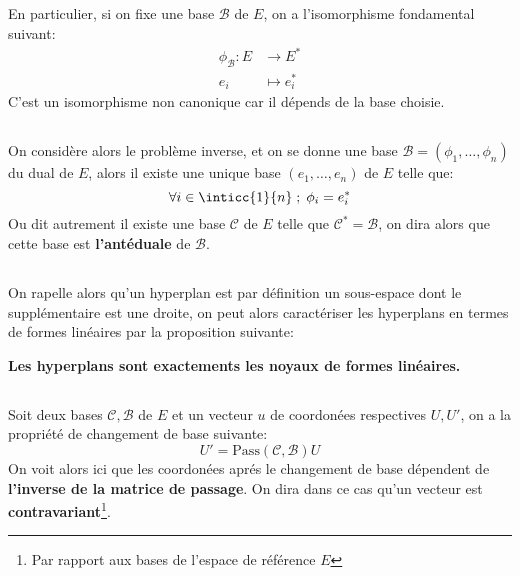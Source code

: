 \subsection*{}
En particulier, si on fixe une base \( \mathscr{B} \) de \( E \), on a l'isomorphisme fondamental suivant:
\[ 
   \begin{aligned}
      \phi_{\mathscr{B}} : E &\longrightarrow E^* \\
      e_i &\longmapsto e_i^*
   \end{aligned} 
\]
C'est un isomorphisme non canonique car il dépends de la base choisie.
\subsection*{}
On considère alors le problème inverse, et on se donne une base \(\mathscr{B} = (\phi_1, \ldots, \phi_n)\) du dual de \(E\), alors il existe une unique base \((e_1, \ldots, e_n)\) de \(E\) telle que:
\[
   \forall i \in \inticc{1}{n} \; ; \; \phi_i = e_i^*   
\] 
Ou dit autrement il existe une base \(\mathscr{C}\) de \(E\) telle que \(\mathscr{C}^* = \mathscr{B}\), on dira alors que cette base est \textbf{l'antéduale} de \( \mathscr{B} \).
\subsection*{}
On rapelle alors qu'un hyperplan est par définition un sous-espace dont le supplémentaire est une droite, on peut alors caractériser les hyperplans en termes de formes linéaires par la proposition suivante:
\begin{center}
   \textbf{Les hyperplans sont exactements les noyaux de formes linéaires.}
\end{center}
\subsection*{}
Soit deux bases \( \mathscr{C}, \mathscr{B}\) de \(E\) et un vecteur \(u\) de coordonées respectives \(U, U'\), on a la propriété de changement de base suivante:
\[
   U' = \text{Pass}(\mathscr{C}, \mathscr{B})U
\]
On voit alors ici que les coordonées aprés le changement de base dépendent de \textbf{l'inverse de la matrice de passage}. On dira dans ce cas qu'un vecteur est \textbf{contravariant}\footnote[1]{Par rapport aux bases de l'espace de référence \( E \)}.
